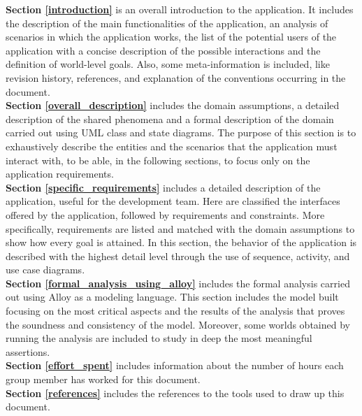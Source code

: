 \documentclass[./main.tex]{subfiles}
\begin{document}
\textbf{Section \ref{introduction}} is an overall introduction to the
application. It includes the description of the main functionalities of the
application, an analysis of scenarios in which the application works, the list
of the potential users of the application with a concise description of the
possible interactions and the definition of world-level goals. Also,
some meta-information is included, like revision history, references,
and explanation of the conventions occurring in the document.
\medskip\\
\textbf{Section \ref{overall_description}} includes the domain assumptions, a
detailed description of the shared phenomena and a formal description of the
domain carried out using UML class and state diagrams. The purpose of
this section is to exhaustively describe the entities and the scenarios
that the application must interact with, to be able, in the following
sections, to focus only on the application requirements.
\medskip\\
\textbf{Section \ref{specific_requirements}} includes a detailed description of
the application, useful for the development team. Here are classified the
interfaces offered by the application, followed by requirements and
constraints. More specifically, requirements are listed and matched with the
domain assumptions to show how every goal is attained. In this section, the
behavior of the application is described with the highest detail level
through the use of sequence, activity, and use case diagrams.
\medskip\\
\textbf{Section \ref{formal_analysis_using_alloy}} includes the formal analysis
carried out using Alloy as a modeling language. This section includes the model
built focusing on the most critical aspects and the results of the analysis
that proves the soundness and consistency of the model. Moreover, some worlds
obtained by running the analysis are included to study in deep the most
meaningful assertions.
\medskip\\
\textbf{Section \ref{effort_spent}} includes information about the number of
hours each group member has worked for this document.
\medskip\\
\textbf{Section \ref{references}} includes the references to the tools used to
draw up this document.
\end{document}
